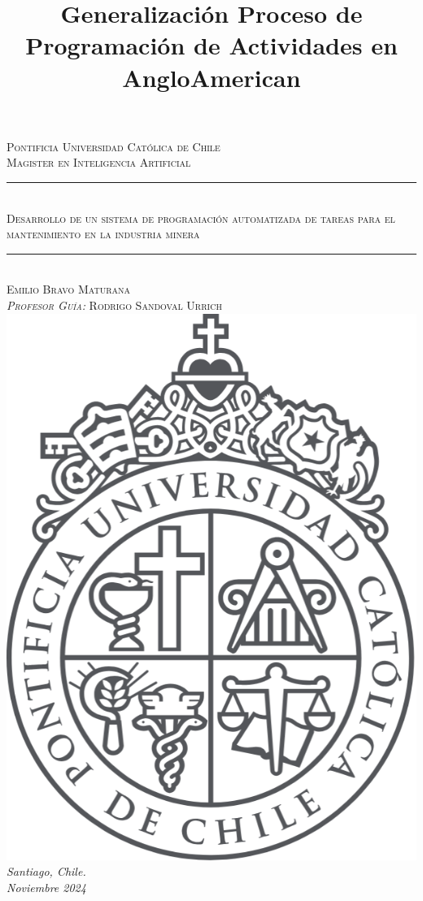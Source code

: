 \documentclass{article}
\title{Generalización Proceso de Programación de Actividades en AngloAmerican}
\date{}
\begin{document}
\begin{titlepage}
\newcommand{\HRule}{\rule{\linewidth}{0.5mm}}
\center
\textsc{\LARGE Pontificia Universidad Católica de Chile}\\[1cm] 
\textsc{\large Magister en Inteligencia Artificial}\\[0.5cm] 
\HRule \\[0.4cm]
\huge \textsc{Desarrollo de un sistema de programación automatizada de tareas para el mantenimiento en la industria minera}\\[0.1cm]
\HRule \\[1cm]
\large\textsc{Emilio Bravo Maturana\\\emph{Profesor Guía: }Rodrigo Sandoval Urrich}\\[1cm]
\includegraphics[scale=0.2]{imgs/UC Logo Grande.png}\\[1cm]
\vfill
{\large\emph{Santiago, Chile. \\ Noviembre 2024 }}\\[2cm]


\end{titlepage}
\end{document}
